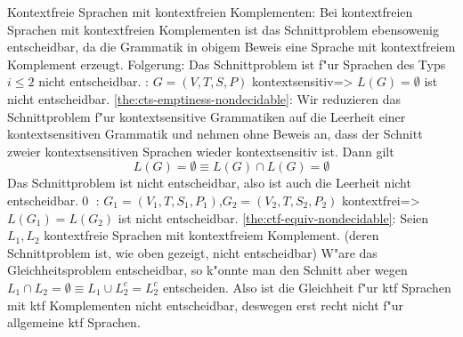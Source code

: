 \remark Kontextfreie Sprachen mit kontextfreien Komplementen:{
  Bei kontextfreien Sprachen mit kontextfreien Komplementen ist das 
  Schnittproblem ebensowenig entscheidbar, da die Grammatik in obigem Beweis
  eine Sprache mit kontextfreiem Komplement erzeugt.
  }
\remark Folgerung:{
  Das Schnittproblem ist f"ur Sprachen des Typs $i\le 2$ nicht entscheidbar.
  }
\theorem: $G=(V,T,S,P)$ kontextsensitiv=>{
  \label{the:cts-emptiness-nondecidable}
  $L(G)=\emptyset$ ist nicht entscheidbar.
  }
\proof \ref{the:cts-emptiness-nondecidable}:{
  Wir reduzieren das Schnittproblem f"ur kontextsensitive Grammatiken
  auf die Leerheit einer kontextsensitiven Grammatik und 
  nehmen ohne Beweis an, dass der Schnitt zweier
  kontextsensitiven Sprachen wieder kontextsensitiv ist. Dann gilt
  \[L(G) = \emptyset \equiv L(G) \cap L(G) = \emptyset
    \]
  Das Schnittproblem ist nicht entscheidbar, also ist auch die Leerheit
  nicht entscheidbar.\qed
  }
\theorem: $G_1=(V_1,T,S_1,P_1)$,$G_2=(V_2,T,S_2,P_2)$ kontextfrei=>{
  \label{the:ctf-equiv-nondecidable}
  $L(G_1)=L(G_2)$ ist nicht entscheidbar.
  }
\proof \ref{the:ctf-equiv-nondecidable}:{
  Seien $L_1,L_2$ kontextfreie Sprachen mit kontextfreiem Komplement.
  (deren Schnittproblem ist, wie oben gezeigt, nicht entscheidbar)
  W"are das Gleichheitsproblem entscheidbar, so k"onnte man
  den Schnitt aber wegen $L_1\cap L_2=\emptyset\equiv L_1\cup L_2^c=L_2^c$
  entscheiden. Also ist die Gleichheit f"ur ktf Sprachen mit ktf Komplementen
  nicht entscheidbar, deswegen erst recht nicht f"ur allgemeine ktf
  Sprachen.
  }
